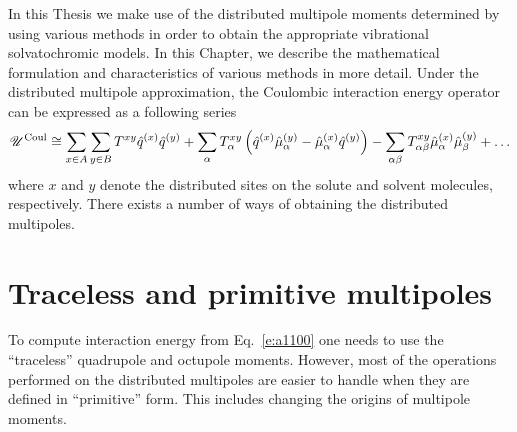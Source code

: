\documentclass[a4paper,titlepage,twoside,fleqn,12pt]{book}
\begin{document}
\begin{appendices}
\begin{refsection}
In this Thesis we make use of the distributed multipole 
moments determined by using various methods in order to obtain
the appropriate vibrational solvatochromic models. In this Chapter,
we describe the mathematical formulation and characteristics of various methods
in more detail.
Under the distributed multipole approximation, the Coulombic
interaction energy operator can be expressed as a following series \citep{Stone.TheTheoryOfIntermolecularForces.1996}
%
\begin{equation} \label{e:a1100}
 \mathscr{U}^{\rm Coul} \cong \sum_{x\in A}\sum_{y\in B}  T^{xy}\hat{q}^{(x)}\hat{q}^{(y)} + 
\sum_\alpha T^{xy}_\alpha \left( \hat{q}^{(x)} \hat{\mu}^{(y)}_\alpha - \hat{\mu}^{(x)}_\alpha \hat{q}^{(y)}\right)
 - \sum_{\alpha\beta} T^{xy}_{\alpha\beta} \hat{\mu}^{(x)}_\alpha \hat{\mu}^{(y)}_\beta + \ldots
\end{equation}
%
where $x$ and $y$ denote the distributed sites on the solute and solvent
molecules, respectively. There exists a number of ways of obtaining
the distributed multipoles. 

\section{Traceless and primitive multipoles}

To compute interaction energy from Eq.~\eqref{e:a1100} one needs 
to use the ``traceless'' quadrupole and octupole moments. However, 
most of the operations performed on the distributed multipoles
are easier to handle when they are defined in ``primitive'' form.
This includes changing the origins of multipole moments.


\end{refsection}
\end{appendices}
\end{document}
